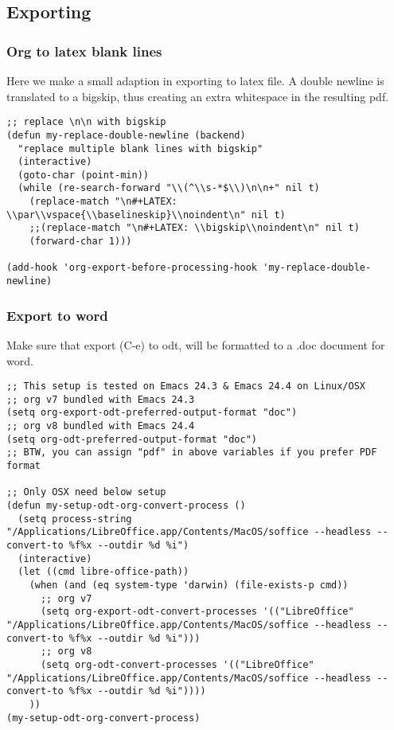 \documentclass[11pt]{article}
\begin{document}
\subsection{Exporting}
\label{sec:org240b849}
\subsubsection{Org to latex blank lines}
\label{sec:org916a5be}
Here we make a small adaption in exporting to latex file. A double newline is translated to a bigskip, thus creating an extra whitespace in the resulting pdf.
\begin{verbatim}
;; replace \n\n with bigskip
(defun my-replace-double-newline (backend)
  "replace multiple blank lines with bigskip"
  (interactive)
  (goto-char (point-min))
  (while (re-search-forward "\\(^\\s-*$\\)\n\n+" nil t)
    (replace-match "\n#+LATEX: \\par\\vspace{\\baselineskip}\\noindent\n" nil t)
    ;;(replace-match "\n#+LATEX: \\bigskip\\noindent\n" nil t)
    (forward-char 1)))

(add-hook 'org-export-before-processing-hook 'my-replace-double-newline)
\end{verbatim}
\subsubsection{Export to word}
\label{sec:orgc77e865}
Make sure that export (C-e) to odt, will be formatted to a .doc document for word.
\begin{verbatim}
;; This setup is tested on Emacs 24.3 & Emacs 24.4 on Linux/OSX
;; org v7 bundled with Emacs 24.3
(setq org-export-odt-preferred-output-format "doc")
;; org v8 bundled with Emacs 24.4
(setq org-odt-preferred-output-format "doc")
;; BTW, you can assign "pdf" in above variables if you prefer PDF format

;; Only OSX need below setup
(defun my-setup-odt-org-convert-process ()
  (setq process-string "/Applications/LibreOffice.app/Contents/MacOS/soffice --headless --convert-to %f%x --outdir %d %i")
  (interactive)
  (let ((cmd libre-office-path))
    (when (and (eq system-type 'darwin) (file-exists-p cmd))
      ;; org v7
      (setq org-export-odt-convert-processes '(("LibreOffice" "/Applications/LibreOffice.app/Contents/MacOS/soffice --headless --convert-to %f%x --outdir %d %i")))
      ;; org v8
      (setq org-odt-convert-processes '(("LibreOffice"  "/Applications/LibreOffice.app/Contents/MacOS/soffice --headless --convert-to %f%x --outdir %d %i"))))
    ))
(my-setup-odt-org-convert-process)
\end{verbatim}
\end{document}
